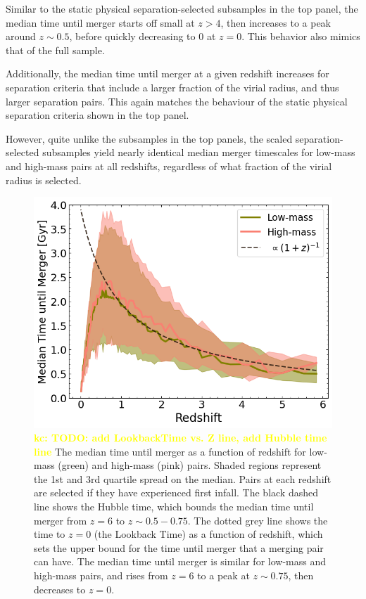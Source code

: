 \documentclass[twocolumn,linenumbers]{aastex631}
\newcommand{\kc}[1]{\textcolor{yellow}{\textbf{kc: #1}} }
\begin{document}
Similar to the static physical separation-selected subsamples in the top panel, the median time until merger starts off small at $z>4$, then increases to a peak around $z\sim0.5$, before quickly decreasing to 0 at $z=0$. 
This behavior also mimics that of the full sample. 

Additionally, the median time until merger at a given redshift increases for separation criteria that include a larger fraction of the virial radius, and thus larger separation pairs. 
This again matches the behaviour of the static physical separation criteria shown in the top panel.

However, quite unlike the subsamples in the top panels, the scaled separation-selected subsamples yield nearly identical median merger timescales for low-mass and high-mass pairs at all redshifts, regardless of what fraction of the virial radius is selected. 






\begin{figure}[htb]
    \centering
    \includegraphics[width=\textwidth]{plots/bet-on-it/3_time_til_merger_full_fit.png}
    \caption{\kc{TODO: add LookbackTime vs. Z line, add Hubble time line} The median time until merger as a function of redshift for low-mass (green) and high-mass (pink) pairs. Shaded regions represent the 1st and 3rd quartile spread on the median. Pairs at each redshift are selected if they have experienced first infall. 
    The black dashed line shows the Hubble time, which bounds the median time until merger from $z=6$ to $z\sim0.5-0.75$.
    The dotted grey line shows the time to $z=0$ (the Lookback Time) as a function of redshift, which sets the upper bound for the time until merger that a merging pair can have. 
    The median time until merger is similar for low-mass and high-mass pairs, and rises from $z=6$ to a peak at $z\sim0.75$, then decreases to $z=0$.}
    \label{fig:timescales}
\end{figure}
\end{document}
